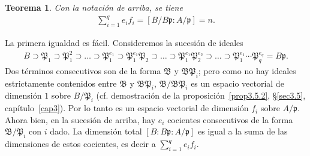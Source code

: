 \documentclass[bibtotoc,leqno,spanish]{amsbook}
\newcommand{\idl}[1]{\mathfrak{#1}}
\numberwithin{equation}{section}
\theoremstyle{note}
\theoremstyle{note}
\newtheorem{theorem}{Teorema}
\theoremstyle{rem}
\numberwithin{theorem}{section}
\numberwithin{proposition}{section}
\numberwithin{definition}{section}
\numberwithin{lemma}{section}
\numberwithin{corollary}{section}
\numberwithin{example}{section}
\numberwithin{footnote}{section}%
\begin{document}
\begin{theorem}\label{teo5.2.1}
Con la notaci\'on de arriba, se tiene
\begin{gather}\label{eq-5.2-2}
\sum_{i=1}^{q}e_{i}f_{i}=[B/B\idl{p}:A/\idl{p}]=n.
\end{gather}
\end{theorem}

La primera igualdad es f\'acil. Consideremos la sucesi\'on de ideales
\begin{gather*}
B\supset\idl{P}_{1}\supset\idl{P}_{1}^{2}\supset\dots\supset\idl{P}_{1}^{e_{1}}\supset\idl{P}_{1}^{e_{1}}\idl{P}_{2}
\supset\dots\supset\idl{P}_{1}^{e_{1}}\idl{P}_{2}^{e_{2}}\supset\dots\supset\idl{P}_{1}^{e_{1}}\cdots\idl{P}_{q}^{e_{q}}
=B\idl{p}.
\end{gather*}
Dos t\'erminos consecutivos son de la forma $\idl{B}$ y $\idl{B}\idl{P}_{i}$; pero como no hay ideales estrictamente
contenidos entre $\idl{B}$ y $\idl{B}\idl{P}_{i}$, $\idl{B}/\idl{B}\idl{P}_{i}$ es un espacio vectorial de dimensi\'on
$1$ sobre $B/\idl{P}_{i}$ (cf. demostraci\'on de la proposici\'on~\ref{prop3.5.2}, \S\ref{sec3.5}, cap\'itulo~\ref{cap3}).
Por lo tanto es un
espacio vectorial de dimensi\'on $f_{i}$ sobre $A/\idl{p}$. Ahora bien, en la sucesi\'on de arriba, hay $e_{i}$
cocientes consecutivos de la forma $\idl{B}/\idl{P}_{i}$ con $i$ dado. La dimensi\'on total $[B:B\idl{p}:A/\idl{p}]$
es igual a la suma de las dimensiones de estos cocientes, es decir a $\sum_{i=1}^{q}e_{i}f_{i}$.
\end{document}
